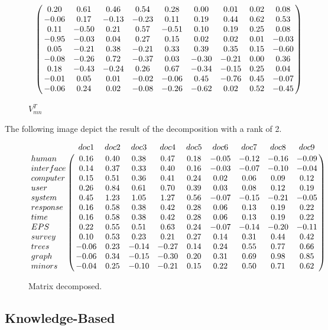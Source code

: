 \begin{figure}[h!]
	\begin{equation} \nonumber
	\bordermatrix{~  \cr	
		& 0.20 & 0.61 & 0.46 & 0.54 & 0.28 & 0.00 & 0.01 & 0.02 & 0.08 \cr
		& -0.06 & 0.17 & -0.13 & -0.23 & 0.11 & 0.19 & 0.44 & 0.62 & 0.53 \cr
		& 0.11 & -0.50 & 0.21 & 0.57 & -0.51 & 0.10 & 0.19 & 0.25 & 0.08 \cr
		& -0.95 & -0.03 & 0.04 & 0.27 & 0.15 & 0.02 & 0.02 & 0.01 & -0.03 \cr
		& 0.05 & -0.21 & 0.38 & -0.21 & 0.33 & 0.39 & 0.35 & 0.15 & -0.60 \cr
		& -0.08 & -0.26 & 0.72 & -0.37 & 0.03 & -0.30 & -0.21 & 0.00 & 0.36 \cr
		& 0.18 & -0.43 & -0.24 & 0.26 & 0.67 & -0.34 & -0.15 & 0.25 & 0.04 \cr
		& -0.01 & 0.05 & 0.01 & -0.02 & -0.06 & 0.45 & -0.76 & 0.45 & -0.07 \cr
		& -0.06 & 0.24 & 0.02 & -0.08 & -0.26 & -0.62 & 0.02 & 0.52 & -0.45 \cr	 
 }
	\end{equation}
	\caption{$V_{mn}^{T}$}
	\label{fig:TDM}
\end{figure}
The following image depict the result of the decomposition with a rank of 2.
\begin{figure}[h!]
	\begin{equation} \nonumber
	\bordermatrix{~ & doc1 & doc2 & doc3 & doc4 & doc5 & doc6 & doc7 & doc8 & doc9 \cr	
		human 	& 0.16 & 0.40 & 0.38 & 0.47 & 0.18 & -0.05 & -0.12 & -0.16 & -0.09 \cr
		interface 	& 0.14 & 0.37 & 0.33 & 0.40 & 0.16 & -0.03 & -0.07 & -0.10 & -0.04 \cr
		computer	& 0.15 & 0.51 & 0.36 & 0.41 & 0.24 & 0.02 & 0.06 & 0.09 & 0.12 \cr
		user 		& 0.26 & 0.84 & 0.61 & 0.70 & 0.39 & 0.03 & 0.08 & 0.12 & 0.19 \cr
		system 	& 0.45 & 1.23 & 1.05 & 1.27 & 0.56 & -0.07 & -0.15 & -0.21 & -0.05 \cr
		response 	& 0.16 & 0.58 & 0.38 & 0.42 & 0.28 & 0.06 & 0.13 & 0.19 & 0.22 \cr
		time 		& 0.16 & 0.58 & 0.38 & 0.42 & 0.28 & 0.06 & 0.13 & 0.19 & 0.22 \cr
		EPS 	 	& 0.22 & 0.55 & 0.51 & 0.63 & 0.24 & -0.07 & -0.14 & -0.20 & -0.11 \cr 
		survey 	& 0.10 & 0.53 & 0.23 & 0.21 & 0.27 & 0.14 & 0.31 & 0.44 & 0.42 \cr
		trees 		& -0.06 & 0.23 & -0.14 & -0.27 & 0.14 & 0.24 & 0.55 & 0.77 & 0.66 \cr
		graph 		& -0.06 & 0.34 & -0.15 & -0.30 & 0.20 & 0.31 & 0.69 & 0.98 & 0.85 \cr
		minors 	& -0.04 & 0.25 & -0.10 & -0.21 & 0.15 & 0.22 & 0.50 & 0.71 & 0.62 \cr	  }
	\end{equation}
	\caption{Matrix decomposed.}
	\label{fig:TDM}
\end{figure}

\subsection{Knowledge-Based}